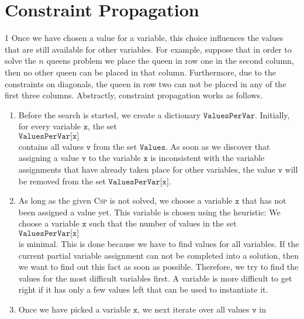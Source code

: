 \section{Constraint Propagation}
1
Once we have chosen a value for a variable, this choice influences the values that are still available for
other variables. 
For example, suppose that in order to solve the $n$ queens problem we place the queen in row one in the second
column, then no other queen can be placed in 
that column.   Furthermore, due to the constraints on diagonals, the queen in row two can not be placed
in any of the first three columns.  Abstractly, constraint propagation works as follows.
\begin{enumerate}
\item Before the search is started, we create a dictionary $\texttt{ValuesPerVar}$.  Initially, for every variable
      $\texttt{x}$,  the set
      \\[0.2cm]
      \hspace*{1.3cm}
      $\texttt{ValuesPerVar[x]}$ 
      \\[0.2cm]
      contains all values $\texttt{v}$ from the set $\texttt{Values}$.  As soon as we discover that assigning a
      value $\texttt{v}$ to the variable $\texttt{x}$ is inconsistent with the variable
      assignments that have already taken place for other variables, the value $\texttt{v}$ will be removed from the set
      $\texttt{ValuesPerVar[x]}$. 
\item As long as the given \textsc{Csp} is not solved,  we choose a variable $\texttt{x}$ that has not been assigned a
      value yet.  This variable is chosen using the 
       heuristic:  We choose a
      variable $\texttt{x}$ such that the number of values in the set
      \\[0.2cm]
      \hspace*{1.3cm}
      $\texttt{ValuesPerVar[x]}$ 
      \\[0.2cm]
      is minimal.  This is done because we have to
      find values for all variables.  If the current partial variable assignment can not be completed into a
      solution, then we want to find out this fact as soon as possible.  Therefore, we try to find the values
      for the most difficult variables first.  A variable is more difficult to get right if it has only a few
      values left that can be used to instantiate it.
\item Once we have picked a variable $\texttt{x}$, we next iterate over all values $\texttt{v}$ in

\end{enumerate}
